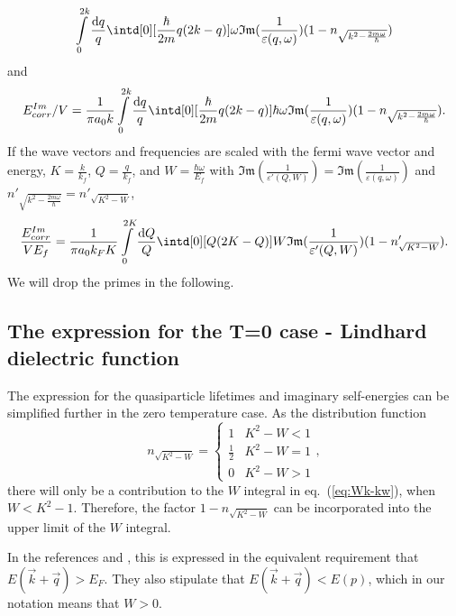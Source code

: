 \documentclass[physics,phd,nolot,nolof]{uccthesis}%
\begin{document}
{\begin{equation}
  \int\limits_0^{2k}\frac{\mathrm{d}q}{q}
  \intd[0][\frac{\hbar}{2m}q(2k-q)]\omega 
  \mathfrak{Im}(\frac{1}{\varepsilon(q,\omega)})
  (1-n_{\sqrt{k^2 -\frac{2m\omega}{\hbar}}})
  \label{eq:Wk-kw}
\end{equation}
and
\begin{equation}
  E_{corr}^{Im}/V = 
  \frac{1}{\pi a_0 k} 
  \int\limits_0^{2k}\frac{\mathrm{d}q}{q}
  \intd[0][\frac{\hbar}{2m}q(2k-q)]{\hbar\omega}
  \mathfrak{Im}(\frac{1}{\varepsilon(q,\omega)})
  (1-n_{\sqrt{k^2 -\frac{2m\omega}{\hbar}}}).
  \label{eq:Wk-kw}
\end{equation}
If the wave vectors and frequencies are scaled with the fermi wave vector and
energy, 
$K=\frac{k}{k_f}$, 
$Q=\frac{q}{k_f}$, 
and
$W = \frac{\hbar\omega}{E_f}$ with
$ \mathfrak{Im}(\frac{1}{\varepsilon'(Q,W)})
= \mathfrak{Im}(\frac{1}{\varepsilon(q,\omega)})$
and 
$ n'_{\sqrt{k^2 -\frac{2m\omega}{\hbar}}}=
 n'_{\sqrt{K^2 -W}}$, 
\begin{equation}
  \frac{ E_{corr}^{Im}}{V E_f} = 
  \frac{1}{\pi a_0 k_F K} 
  \int\limits_0^{2K}\frac{\mathrm{d}Q}{Q}
  \intd[0][Q(2K-Q)]W
  \mathfrak{Im}(\frac{1}{\varepsilon'(Q,W)})
 (1-n'_{\sqrt{K^2 -W}}). 
  \label{eq:Wk-kw}
\end{equation}
We will drop the primes in the following.
\subsection{The expression for the T=0 case - Lindhard dielectric function}
The expression for the quasiparticle lifetimes and imaginary self-energies
can be simplified further in the zero temperature case.
As the distribution function 
\begin{equation}
  n_{\sqrt{K^2-W}} =
  \begin{cases}
    1		&	K^2 -W < 1\\
    \frac{1}{2}	&	K^2 -W = 1\\
    0		&	K^2 -W > 1
  \end{cases},
  \label{eq:n-T=0}
\end{equation}
there will only be a contribution to the $W$ integral in eq.~(\ref{eq:Wk-kw}),
when $W<K^2-1$.
Therefore, the factor $1-n_{\sqrt{K^2-W}} $ can be incorporated into 
the upper limit of the $W$ integral.

In the references \cite{QuinnFerrell} and \cite{Quinn1962}, 
this is expressed in the equivalent requirement that
$E(\vec k + \vec q) > E_F $.
They also stipulate that 
$E(\vec k + \vec q) < E(p) $, which in our notation means that $W>0$.\\

}
\end{document}
